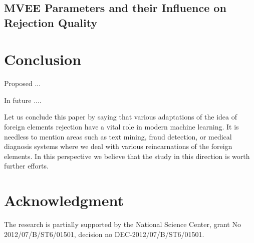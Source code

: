 \documentclass{llncs}
\begin{document}
\subsection{MVEE Parameters and their Influence on Rejection Quality}


\section{Conclusion}
  \label{sec:Conclusion}

Proposed ...


In future ....

Let us conclude this paper by saying that various adaptations of the idea of foreign elements rejection have a vital role in modern machine learning. It is needless to mention areas such as text mining, fraud detection, or medical diagnosis systems where we deal with various reincarnations of the foreign elements. In this perspective we believe that the study in this direction is worth further efforts.


\section*{Acknowledgment}

\noindent The research is partially supported  by the National Science Center, grant No 2012/07/B/ST6/01501, decision no \mbox{DEC-2012/07/B/ST6/01501}.
\end{document}
